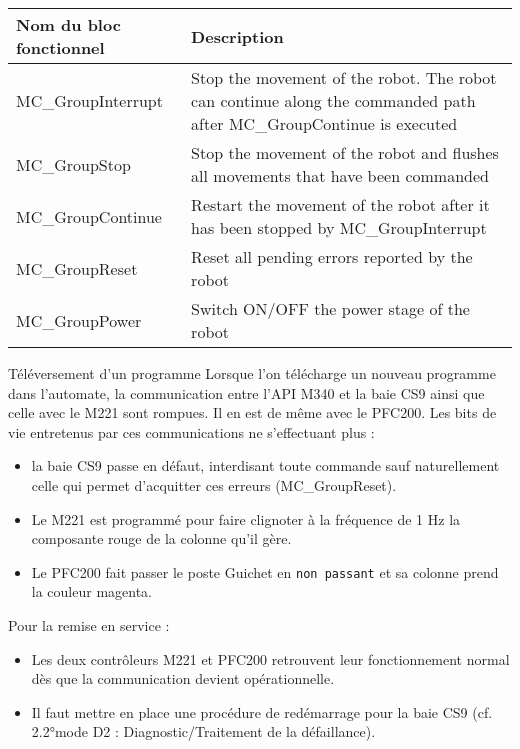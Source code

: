 \begin{center}
    \begin{tabular}{l|p{10cm}}
        \textbf{Nom du bloc fonctionnel} & \textbf{Description} \\
        \hline
        MC\_GroupInterrupt & Stop the movement of the robot. The robot can continue along the commanded path after MC\_GroupContinue is executed \\
        MC\_GroupStop & Stop the movement of the robot and flushes all movements that have been commanded \\
        MC\_GroupContinue & Restart the movement of the robot after it has been stopped by MC\_GroupInterrupt \\
        MC\_GroupReset & Reset all pending errors reported by the robot \\
        MC\_GroupPower & Switch ON/OFF the power stage of the robot \\
    \end{tabular}
\end{center}


\begin{UPSTIinfor}{Téléversement d'un programme}
    Lorsque l'on télécharge un nouveau programme dans l'automate, la communication entre l'API M340 et la baie CS9 ainsi que celle avec le M221 sont rompues. Il en est de même avec le PFC200. Les bits de vie entretenus par ces communications ne s'effectuant plus : 
    \begin{itemize}
        \item la baie CS9 passe en défaut, interdisant toute commande sauf naturellement celle qui permet d'acquitter ces erreurs (MC\_GroupReset).
        \item Le M221 est programmé pour faire clignoter à la fréquence de 1 Hz la composante rouge de la colonne qu'il gère.
        \item Le PFC200 fait passer le poste Guichet en \texttt{non passant} et sa colonne prend la couleur magenta.
    \end{itemize}

    Pour la remise en service : 
    \begin{itemize}
        \item Les deux contrôleurs M221 et PFC200 retrouvent leur fonctionnement normal dès que la communication devient opérationnelle.
        \item Il faut mettre en place une procédure de redémarrage pour la baie CS9 (cf. 2.2°mode D2 : Diagnostic/Traitement de la défaillance).
    \end{itemize}
\end{UPSTIinfor}


